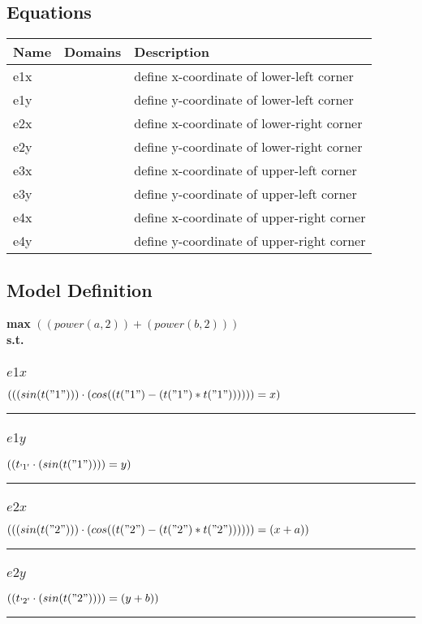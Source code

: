 \documentclass[11pt]{article}
\begin{document}
\subsection*{Equations}
\begin{tabularx}{\textwidth}{| l | l | X |}
\hline
\textbf{Name} & \textbf{Domains} & \textbf{Description}\\
\hline
\endhead

e1x &  & define x-coordinate of lower-left corner\\
e1y &  & define y-coordinate of lower-left corner\\
e2x &  & define x-coordinate of lower-right corner\\
e2y &  & define y-coordinate of lower-right corner\\
e3x &  & define x-coordinate of upper-left corner\\
e3y &  & define y-coordinate of upper-left corner\\
e4x &  & define x-coordinate of upper-right corner\\
e4y &  & define y-coordinate of upper-right corner\\
\hline
\end{tabularx}
\subsection*{Model Definition}
\textbf{max} $(( power(a,2) ) + ( power(b,2) ))$\\
\textbf{s.t.}
\subsubsection*{$e1x$}
$
((( sin(t("1")) ) \cdot ( cos((t("1") - (t("1") * t("1")))) )) = x)
$
\vspace{5pt}
\hrule
\subsubsection*{$e1y$}
$
((t_\text{\text{\textquotesingle 1\textquotesingle}} \cdot ( sin(t("1")) )) = y)
$
\vspace{5pt}
\hrule
\subsubsection*{$e2x$}
$
((( sin(t("2")) ) \cdot ( cos((t("2") - (t("2") * t("2")))) )) = (x + a))
$
\vspace{5pt}
\hrule
\subsubsection*{$e2y$}
$
((t_\text{\text{\textquotesingle 2\textquotesingle}} \cdot ( sin(t("2")) )) = (y + b))
$
\vspace{5pt}
\hrule
\end{document}
